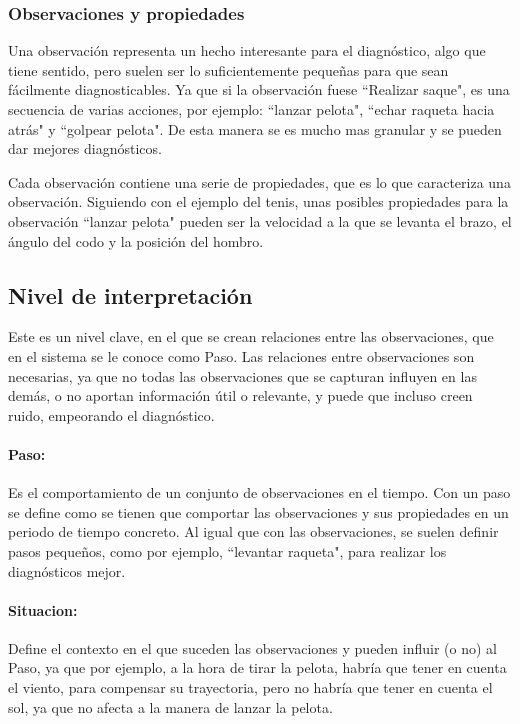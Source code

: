 \subsubsection{Observaciones y propiedades}
Una observaci\'on representa un hecho interesante para el diagn\'ostico, algo que tiene sentido, pero suelen
ser lo suficientemente peque\~nas para que sean f\'acilmente diagnosticables. Ya que si la observaci\'on
fuese ``Realizar saque", es una secuencia de varias acciones, por ejemplo: ``lanzar pelota", ``echar raqueta hacia atr\'as"
y ``golpear pelota". De esta manera se es mucho mas granular y se pueden dar mejores diagn\'osticos.

Cada observaci\'on contiene una serie de propiedades, que es lo que caracteriza una observaci\'on. 
Siguiendo con el ejemplo del tenis, unas posibles propiedades para la observaci\'on ``lanzar pelota"
pueden ser la velocidad a la que se levanta el brazo, el \'angulo del codo y la posici\'on del hombro.

\subsection{Nivel de interpretaci\'on}
Este es un nivel clave, en el que se crean relaciones entre las observaciones, que en el sistema se le conoce como Paso.
Las relaciones entre observaciones son necesarias, ya que no todas las observaciones que se capturan influyen en las dem\'as,
o no aportan informaci\'on \'util o relevante, y puede que incluso creen ruido, empeorando el diagn\'ostico.

\paragraph{\textbf{Paso:}}
Es el comportamiento de un conjunto de observaciones en el tiempo. Con un paso se define como se tienen
que comportar las observaciones y sus propiedades en un periodo de tiempo concreto. Al igual que con las observaciones,
se suelen definir pasos peque\~nos, como por ejemplo, ``levantar raqueta", para realizar los diagn\'osticos mejor.

\paragraph{\textbf{Situacion:}}
Define el contexto en el que suceden las observaciones y pueden influir (o no) al Paso, ya que por ejemplo, a la hora
de tirar la pelota, habr\'ia que tener en cuenta el viento, para compensar su trayectoria, pero no habr\'ia que tener
en cuenta el sol, ya que no afecta a la manera de lanzar la pelota.

